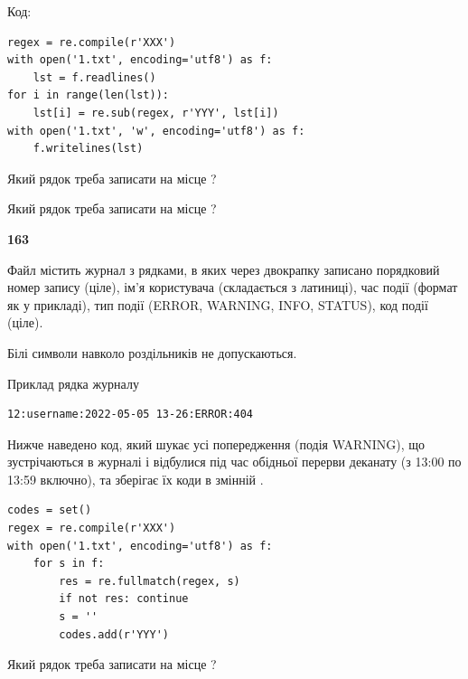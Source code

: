 Код:



\begin{verbatim}
regex = re.compile(r'XXX')
with open('1.txt', encoding='utf8') as f:
    lst = f.readlines()
for i in range(len(lst)):
    lst[i] = re.sub(regex, r'YYY', lst[i])
with open('1.txt', 'w', encoding='utf8') as f:
    f.writelines(lst)
\end{verbatim}







Який рядок треба записати на місце  ?\par
\vspace{5mm}


Який рядок треба записати на місце  ?\par


\newpage

{\begin {center}\textbf{ 163}\end {center}}\par
Файл  містить журнал з рядками, в яких через двокрапку записано поряд\-ко\-вий номер запису (ціле), ім'я користувача (складається з латиниці), час події (фор\-мат як у прикладі), тип події (ERROR, WARNING, INFO, STATUS), код події (ціле).

Білі символи навколо роздільників не допускаються.

Приклад рядка журналу



\begin{verbatim}
12:username:2022-05-05 13-26:ERROR:404
\end{verbatim}


Нижче наведено код, який шукає усі попередження (подія WARNING), що зустрі\-ча\-ються в журналі і відбулися під час обідньої перерви деканату (з 13:00 по 13:59 включно), та зберігає їх коди в змінній .



\begin{verbatim}
codes = set()
regex = re.compile(r'XXX')
with open('1.txt', encoding='utf8') as f:
    for s in f:
        res = re.fullmatch(regex, s)
        if not res: continue
        s = ''
        codes.add(r'YYY')
\end{verbatim}







Який рядок треба записати на місце  ?\par
\vspace{5mm}



